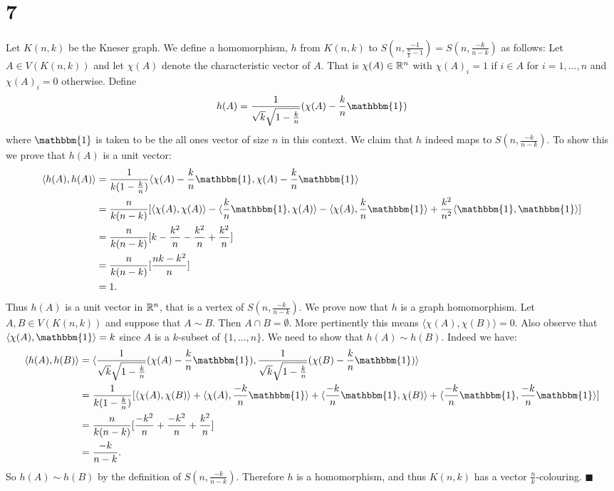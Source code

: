 \documentclass[letterpaper,12pt,oneside,onecolumn]{article}
\newcommand{\1}{\mathbbm{1}}
\begin{document}
\section*{7}
\paragraph{}
Let $K(n,k)$ be the Kneser graph. We define a homomorphism, $h$ from $K(n,k)$ to $S(n, \frac{-1}{\frac{n}{k}-1}) = S(n, \frac{-k}{n-k})$ as follows: Let $A \in V(K(n,k))$ and let $\chi(A)$ denote the characteristic vector of $A$. That is $\chi(A) \in \mathbb{R}^n$ with $\chi(A)_i = 1$ if $i \in A$ for $i =1,\dots, n$ and $\chi(A)_i = 0$ otherwise. Define
$$h(A) = \frac{1}{\sqrt{k}\sqrt{1 - \frac{k}{n}}} (\chi(A) - \frac{k}{n} \1)$$
where $\1$ is taken to be the all ones vector of size $n$ in this context. We claim that $h$ indeed maps to $S(n,\frac{-k}{n-k})$. To show this we prove that $h(A)$ is a unit vector:
\begin{align*}
\langle h(A), h(A) \rangle &= \frac{1}{k(1-\frac{k}{n})}\langle \chi(A) - \frac{k}{n}\1, \chi(A) - \frac{k}{n}\1\rangle \\
&= \frac{n}{k(n-k)} [\langle \chi(A), \chi(A) \rangle - \langle \frac{k}{n}\1, \chi(A) \rangle -\langle \chi(A), \frac{k}{n}\1 \rangle + \frac{k^2}{n^2}\langle \1, \1\rangle]\\
&= \frac{n}{k(n-k)}[k - \frac{k^2}{n} - \frac{k^2}{n} + \frac{k^2}{n}] \\
&= \frac{n}{k(n-k)}[\frac{nk - k^2}{n}] \\
&= 1.
\end{align*}
Thus $h(A)$ is a unit vector in $\mathbb{R}^n$, that is a vertex of $S(n,\frac{-k}{n-k})$.
 We prove now that $h$ is a graph homomorphism. Let $A,B \in V(K(n,k))$ and suppose that $A\sim B$. Then $A\cap B = \emptyset$. More pertinently this means $\langle \chi(A), \chi(B) \rangle = 0$. Also observe that $\langle \chi(A), \1\rangle = k$ since $A$ is a $k$-subset of $\{1, \dots, n\}$. We need to show that $h(A) \sim h(B)$. Indeed we have:
\begin{align*}
\langle h(A), h(B) \rangle &= \langle  \frac{1}{\sqrt{k}\sqrt{1 - \frac{k}{n}}} (\chi(A) - \frac{k}{n} \1),  \frac{1}{\sqrt{k}\sqrt{1 - \frac{k}{n}}} (\chi(B) - \frac{k}{n} \1) \rangle \\
&= \frac{1}{k(1-\frac{k}{n})}[\langle \chi(A), \chi(B)\rangle + \langle \chi(A), \frac{-k}{n}\1\rangle + \langle \frac{-k}{n} \1, \chi(B) \rangle + \langle \frac{-k}{n} \1, \frac{-k}{n} \1\rangle] \\
&= \frac{n}{k(n-k)}[\frac{-k^2}{n} + \frac{-k^2}{n} + \frac{k^2}{n}] \\
&= \frac{-k}{n-k}.
\end{align*}
So $h(A) \sim h(B)$ by the definition of $S(n, \frac{-k}{n-k})$. Therefore $h$ is a homomorphism, and thus $K(n,k)$ has a vector $\frac{n}{k}$-colouring. $\blacksquare$
\end{document}
